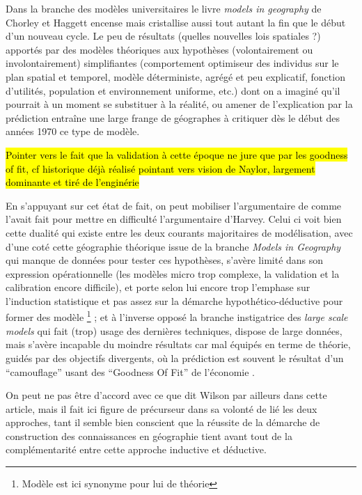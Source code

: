 Dans la branche des modèles universitaires le livre \textit{models in geography} de Chorley et Haggett encense mais cristallise aussi \textcite{Golledge2006} tout autant la fin que le début d'un nouveau cycle. Le peu de résultats (quelles nouvelles lois spatiales ?) apportés par des modèles théoriques aux hypothèses (volontairement ou involontairement) simplifiantes (comportement optimiseur des individus sur le plan spatial et temporel, modèle déterministe, agrégé et peu explicatif, fonction d'utilités, population et environnement uniforme, etc.) dont on a imaginé qu'il pourrait à un moment se substituer à la réalité, ou amener de l'explication par la prédiction \autocite[41]{Gregory1978} entraîne une large frange de géographes à critiquer dès le début des années 1970 ce type de modèle.

\hl{Pointer vers le fait que la validation à cette époque ne jure que par les goodness of fit, cf historique déjà réalisé pointant vers vision de Naylor, largement dominante et tiré de l'enginérie}

En s'appuyant sur cet état de fait, on peut mobiliser l'argumentaire de \autocite{Wilson1972} comme l'avait fait \autocite{Gregory1978} pour mettre en difficulté l'argumentaire d'Harvey. Celui ci voit bien cette dualité qui existe entre les deux courants majoritaires de modélisation, avec d'une coté cette géographie théorique issue de la branche \textit{Models in Geography} qui manque de données pour tester ces hypothèses, s'avère limité dans son expression opérationnelle (les modèles micro trop complexe, la validation et la calibration encore difficile), et porte selon lui encore trop l'emphase sur l'induction statistique et pas assez sur la démarche hypothético-déductive pour former des modèle \footnote{Modèle est ici synonyme pour lui de théorie} ; et à l'inverse opposé la branche instigatrice des \textit{large scale models} qui fait (trop) usage des dernières techniques, dispose de large données, mais s'avère incapable du moindre résultats car mal équipés en terme de théorie, guidés par des objectifs divergents, où la prédiction est souvent le résultat d'un \enquote{camouflage} usant des \enquote{Goodness Of Fit} de l'économie \autocite[10]{Batty1994}.

On peut ne pas être d'accord avec ce que dit Wilson par ailleurs dans cette article, mais il fait ici figure de précurseur dans sa volonté de lié les deux approches, tant il semble bien conscient que la réussite de la démarche de construction des connaissances en géographie tient avant tout de la complémentarité entre cette approche inductive et déductive.

